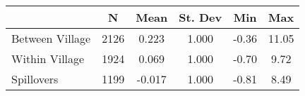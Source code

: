 \begin{tabular}{l*{5}{c}}\hline&\multicolumn{1}{c}{N}&\multicolumn{1}{c}{Mean}&\multicolumn{1}{c}{St. Dev}&\multicolumn{1}{c}{Min}&\multicolumn{1}{c}{Max}\\ \hline 
Between Village & 2126 & 0.223 & 1.000 & -0.36 & 11.05 \\
Within Village & 1924 & 0.069 & 1.000 & -0.70 & 9.72 \\
Spillovers & 1199 & -0.017 & 1.000 & -0.81 & 8.49 \\
\hline \end{tabular}
